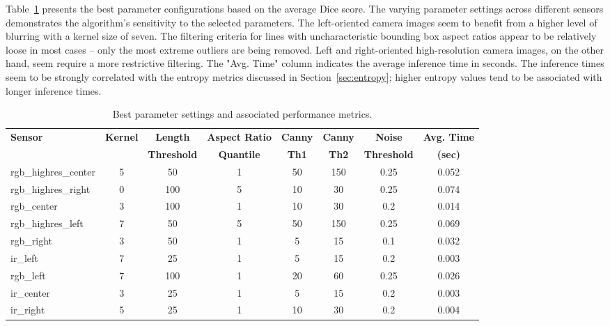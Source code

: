 \documentclass[Master,MDS,english]{BASE/twbook} %
\begin{document}
Table~\ref{tab:sensor_parameters} presents the best parameter configurations based on the average Dice score. The varying parameter settings across different sensors demonstrates the algorithm's sensitivity to the selected parameters.
The left-oriented camera images seem to benefit from a higher level of blurring with a kernel size of seven. 
The filtering criteria for lines with uncharacteristic bounding box aspect ratios appear to be relatively loose in most cases -- only the most extreme outliers are being removed. Left and right-oriented high-resolution camera images, on the other hand, seem require a more restrictive filtering. 
The "Avg. Time" column indicates the average inference time in seconds. The inference times seem to be strongly correlated with the entropy metrics discussed in Section~\ref{sec:entropy}; higher entropy values tend to be associated with longer inference times.


\begin{table}[htbp]
\footnotesize
    \centering
    \begin{tabular}{|l|c|c|c|c|c|c|c|}
        \hline
        \textbf{Sensor} & \textbf{Kernel} & \textbf{Length}  & \textbf{Aspect Ratio } & \textbf{Canny } & \textbf{Canny } & \textbf{Noise} & \textbf{Avg. Time } \\
         &  & \textbf{Threshold} & \textbf{Quantile} & \textbf{Th1} & \textbf{Th2} & \textbf{Threshold} & \textbf{(sec)} \\
        \hline
        rgb\_highres\_center & 5 & 50 & 1 & 50 & 150 & 0.25 & 0.052 \\
        rgb\_highres\_right & 0 & 100 & 5 & 10 & 30 & 0.25 & 0.074 \\
        rgb\_center & 3 & 100 & 1 & 10 & 30 & 0.2 & 0.014 \\
        rgb\_highres\_left & 7 & 50 & 5 & 50 & 150 & 0.25 & 0.069 \\
        rgb\_right & 3 & 50 & 1 & 5 & 15 & 0.1 & 0.032 \\
        ir\_left & 7 & 25 & 1 & 5 & 15 & 0.2 & 0.003 \\
        rgb\_left & 7 & 100 & 1 & 20 & 60 & 0.25 & 0.026 \\
        ir\_center & 3 & 25 & 1 & 5 & 15 & 0.2 & 0.003 \\
        ir\_right & 5 & 25 & 1 & 10 & 30 & 0.2 & 0.004 \\
        \hline
    \end{tabular}
      \caption{Best parameter settings and associated performance metrics.}
    \label{tab:sensor_parameters}
\end{table}
\end{document}
